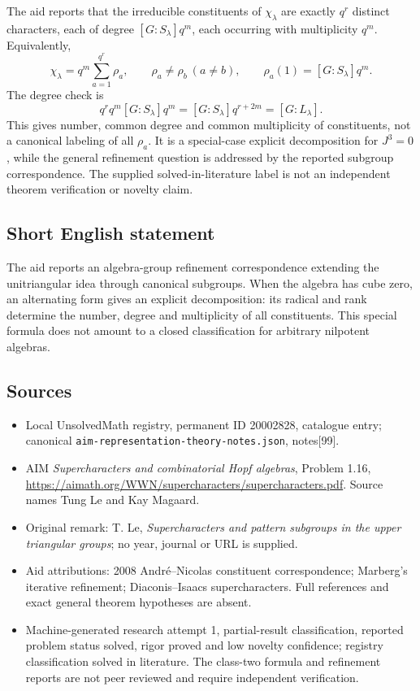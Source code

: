\documentclass[11pt]{article}
\begin{document}
The aid reports that the irreducible constituents of \(\chi_\lambda\) are exactly \(q^r\) distinct characters, each of degree \([G:S_\lambda]q^m\), each occurring with multiplicity \(q^m\). Equivalently,
\[
 \chi_\lambda=q^m\sum_{a=1}^{q^r}\rho_a,\qquad
 \rho_a\ne\rho_b\ (a\ne b),\qquad
 \rho_a(1)=[G:S_\lambda]q^m.
\]
The degree check is
\[
 q^r q^m[G:S_\lambda]q^m
        =[G:S_\lambda]q^{r+2m}=[G:L_\lambda].
\]
This gives number, common degree and common multiplicity of constituents, not a canonical labeling of all \(\rho_a\). It is a special-case explicit decomposition for \(J^3=0\), while the general refinement question is addressed by the reported subgroup correspondence. The supplied solved-in-literature label is not an independent theorem verification or novelty claim.
\subsection{Short English statement}
The aid reports an algebra-group refinement correspondence extending the unitriangular idea through canonical subgroups. When the algebra has cube zero, an alternating form gives an explicit decomposition: its radical and rank determine the number, degree and multiplicity of all constituents. This special formula does not amount to a closed classification for arbitrary nilpotent algebras.
\subsection{Sources}
\begin{itemize}
\item Local UnsolvedMath registry, permanent ID 20002828, catalogue entry; canonical \texttt{aim-representation-theory-notes.json}, notes[99].
\item AIM \emph{Supercharacters and combinatorial Hopf algebras}, Problem 1.16, \url{https://aimath.org/WWN/supercharacters/supercharacters.pdf}. Source names Tung Le and Kay Magaard.
\item Original remark: T. Le, \emph{Supercharacters and pattern subgroups in the upper triangular groups}; no year, journal or URL is supplied.
\item Aid attributions: 2008 Andr\'e--Nicolas constituent correspondence; Marberg's iterative refinement; Diaconis--Isaacs supercharacters. Full references and exact general theorem hypotheses are absent.
\item Machine-generated research attempt 1, partial-result classification, reported problem status solved, rigor proved and low novelty confidence; registry classification solved in literature. The class-two formula and refinement reports are not peer reviewed and require independent verification.
\end{itemize}
\end{document}
